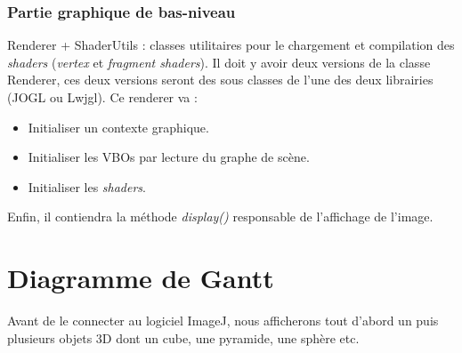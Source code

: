 \documentclass[11pt]{report}
\begin{document}
\subsection{Partie graphique de bas-niveau}
Renderer + ShaderUtils : classes utilitaires pour le chargement et compilation des \textit{shaders} (\textit{vertex} et \textit{fragment shaders}).
Il doit y avoir deux versions de la classe Renderer, ces deux versions seront des sous classes de l'une des deux librairies (JOGL ou Lwjgl).
Ce renderer va :
\begin{itemize}
\item Initialiser un contexte graphique. %
\item Initialiser les VBOs par lecture du graphe de scène.
\item Initialiser les \textit{shaders}. %
\end{itemize}
Enfin, il contiendra la méthode \textit{display()} responsable de l'affichage de l'image.



  

\chapter{Diagramme de Gantt} %

 Avant de le connecter au logiciel ImageJ, nous afficherons tout d'abord un puis plusieurs objets 3D dont un cube, une pyramide, une sphère etc.  
\end{document}
